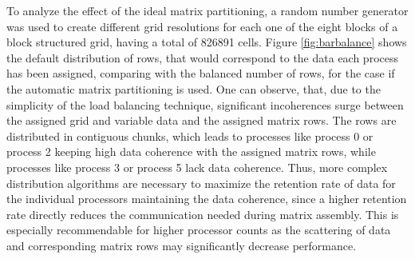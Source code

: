To analyze the effect of the ideal matrix partitioning, a random number generator was used to create different grid resolutions for each one of the eight blocks of a block structured grid, having a total of 826891 cells. Figure \ref{fig:barbalance} shows the default distribution of rows, that would correspond to the data each process has been assigned, comparing with the balanced number of rows, for the case if the automatic matrix partitioning is used. One can observe, that, due to the simplicity of the load balancing technique, significant incoherences surge between the assigned grid and variable data and the assigned matrix rows. The rows are distributed in contiguous chunks, which leads to processes like process 0 or process 2 keeping high data coherence with the assigned matrix rows, while processes like process 3 or process 5 lack data coherence. Thus, more complex distribution algorithms are necessary to maximize the retention rate of data for the individual processors maintaining the data coherence, since a higher retention rate directly reduces the communication needed during matrix assembly. This is especially recommendable for higher processor counts as the scattering of data and corresponding matrix rows may significantly decrease performance.

